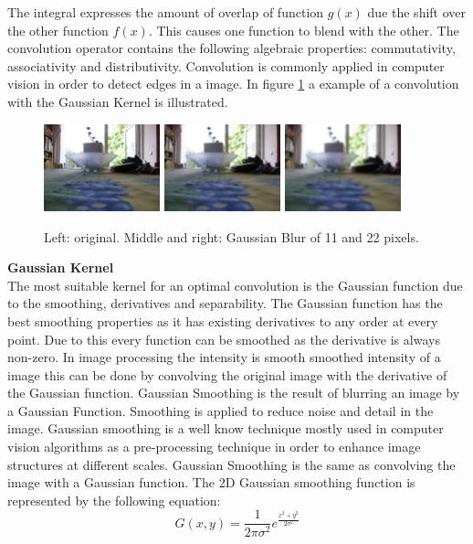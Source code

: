 \documentclass[a4paper]{article}
\begin{document}
\begin{appendices}
The integral expresses the amount of overlap of function $g(x)$
due the shift over the other function $f(x)$. This causes one function to blend with the other. The convolution operator contains the following algebraic properties: commutativity, associativity and distributivity. Convolution is commonly applied in computer vision in order to detect edges in a image. In figure \ref{gaussianblur} a example of a convolution with the Gaussian Kernel is illustrated.
\begin{figure}[!ht]
\centering
\includegraphics[width=0.3\textwidth]{images/gauss_orig.jpg}
\includegraphics[width=0.3\textwidth]{images/gauss_11.png}
\includegraphics[width=0.3\textwidth]{images/gauss_21.png}
\caption[Gaussian Blur]{Left: original. Middle and right: Gaussian Blur of 11 and 22 pixels.}
\label{gaussianblur}
\end{figure}

\noindent\textbf{Gaussian Kernel}\\
The most suitable kernel for an optimal convolution is the Gaussian function due to the smoothing, derivatives and separability. The Gaussian function has the best smoothing properties as it has existing derivatives to any order at every point. Due to this every function can be smoothed as the derivative is always non-zero. In image processing the intensity is smooth smoothed intensity of a image this can be done by convolving the original image with the derivative of the Gaussian function. Gaussian Smoothing is the result of blurring an image by a Gaussian Function. Smoothing is applied to reduce noise and detail in the image. Gaussian smoothing is a well know technique mostly used in computer vision algorithms as a pre-processing technique in order to enhance image structures at different scales. Gaussian Smoothing is the same as convolving the image with a Gaussian function. The 2D Gaussian smoothing function is represented by the following equation:
\begin{equation*}
G(x,y) = \frac{1}{2\pi\sigma^2}e^{\frac{x^2 + y^2}{2\sigma^2}}
\end{equation*}


\end{appendices}
\end{document}
